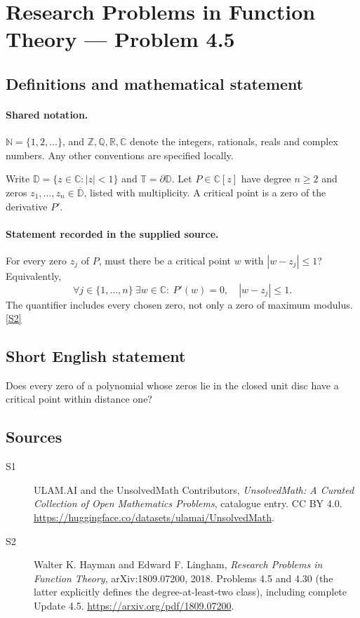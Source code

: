 \documentclass[11pt]{book}
\newcommand{\sref}[2]{\hyperlink{source:#1:#2}{[S#2]}}
\begin{document}
\section{Research Problems in Function Theory — Problem 4.5}\label{statement}

\subsection{Definitions and mathematical statement}

\paragraph{Shared notation.}$\mathbb N=\{1,2,\ldots\}$, and $\mathbb Z,\mathbb Q,\mathbb R,\mathbb C$ denote the integers, rationals, reals and complex numbers. Any other conventions are specified locally.


Write $\mathbb D=\{z\in\mathbb C:|z|<1\}$ and $\mathbb T=\partial\mathbb D$. Let $P\in\mathbb C[z]$ have degree $n\ge2$ and zeros $z_1,\ldots,z_n\in\overline{\mathbb D}$, listed with multiplicity. A critical point is a zero of the derivative $P'$.
\paragraph{Statement recorded in the supplied source.}
For every zero $z_j$ of $P$, must there be a critical point $w$ with $|w-z_j|\le1$? Equivalently,
\[\forall j\in\{1,\ldots,n\}\ \exists w\in\mathbb C:\ P'(w)=0,\quad|w-z_j|\le1.
\]
The quantifier includes every chosen zero, not only a zero of maximum modulus. \sref{statement}{2}
\subsection{Short English statement}
Does every zero of a polynomial whose zeros lie in the closed unit disc have a critical point within distance one?
\subsection{Sources}
\begin{description}
\item[\hypertarget{source:statement:1}{S1}] ULAM.AI and the UnsolvedMath Contributors, \emph{UnsolvedMath: A Curated Collection of Open Mathematics Problems}, catalogue entry. CC BY 4.0. \url{https://huggingface.co/datasets/ulamai/UnsolvedMath}.
\item[\hypertarget{source:statement:2}{S2}] Walter K. Hayman and Edward F. Lingham, \emph{Research Problems in Function Theory}, arXiv:1809.07200, 2018. Problems 4.5 and 4.30 (the latter explicitly defines the degree-at-least-two class), including complete Update 4.5. \url{https://arxiv.org/pdf/1809.07200}.
\end{description}
\label{end:statement}
\end{document}
